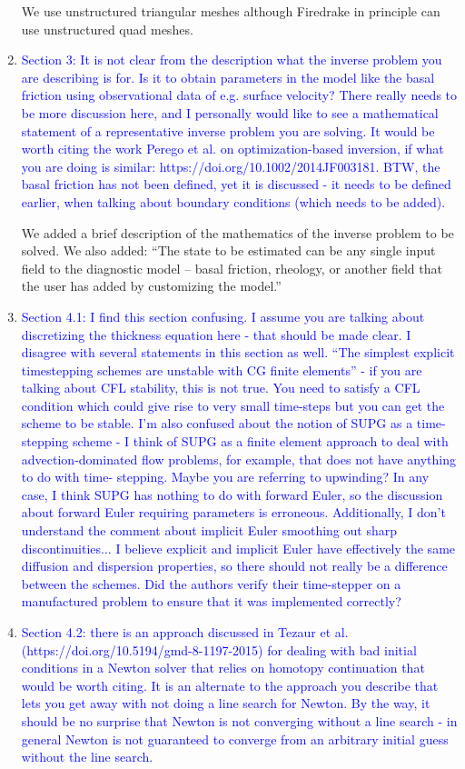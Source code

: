 \documentclass{article}
\theoremstyle{definition}
\theoremstyle{plain}
\begin{document}
\begin{enumerate}
We use unstructured triangular meshes although Firedrake in principle can use unstructured quad meshes.
\item \textcolor{blue}{Section 3: It is not clear from the description what the inverse problem you are describing is for.
Is it to obtain parameters in the model like the basal friction using observational data of e.g. surface velocity? There really needs to be more discussion here, and I personally would like to see
a mathematical statement of a representative inverse problem you are solving. It would be worth
citing the work Perego et al. on optimization-based inversion, if what you are doing is similar:
https://doi.org/10.1002/2014JF003181. BTW, the basal friction has not been defined, yet it is
discussed - it needs to be defined earlier, when talking about boundary conditions (which needs to
be added).}

We added a brief description of the mathematics of the inverse problem to be solved.
We also added: ``The state to be estimated can be any single input field to the diagnostic model -- basal friction, rheology, or another field that the user has added by customizing the model.''

\item \textcolor{blue}{Section 4.1: I find this section confusing. I assume you are talking about discretizing the thickness
equation here - that should be made clear. I disagree with several statements in this section as
well. ``The simplest explicit timestepping schemes are unstable with CG finite elements'' - if you are
talking about CFL stability, this is not true. You need to satisfy a CFL condition which could give
rise to very small time-steps but you can get the scheme to be stable. I'm also confused about the
notion of SUPG as a time-stepping scheme - I think of SUPG as a finite element approach to deal
with advection-dominated flow problems, for example, that does not have anything to do with time-
stepping. Maybe you are referring to upwinding? In any case, I think SUPG has nothing to do with
forward Euler, so the discussion about forward Euler requiring parameters is erroneous. Additionally,
I don't understand the comment about implicit Euler smoothing out sharp discontinuities... I believe
explicit and implicit Euler have effectively the same diffusion and dispersion properties, so there
should not really be a difference between the schemes. Did the authors verify their time-stepper on
a manufactured problem to ensure that it was implemented correctly?}
\item \textcolor{blue}{Section 4.2: there is an approach discussed in Tezaur et al. (https://doi.org/10.5194/gmd-8-1197-2015)
for dealing with bad initial conditions in a Newton solver that relies on homotopy continuation that
would be worth citing. It is an alternate to the approach you describe that lets you get away with not
doing a line search for Newton. By the way, it should be no surprise that Newton is not converging
without a line search - in general Newton is not guaranteed to converge from an arbitrary initial
guess without the line search.}


\end{enumerate}
\end{document}

